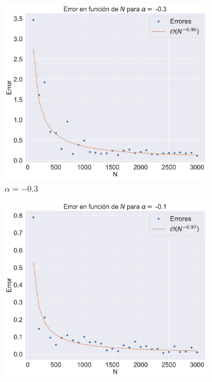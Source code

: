 \begin{figure}[h]
    \centering
    \begin{subfigure}[b]{0.32\textwidth}
        \centering
        \includegraphics[width=\textwidth]{img/content/chapter3/Linear1Errors.pdf}
        \caption{$\alpha=-0.3$}
        \label{fig:image1}
    \end{subfigure}
    \hfill
    \begin{subfigure}[b]{0.32\textwidth}
        \centering
        \includegraphics[width=\textwidth]{img/content/chapter3/Linear2Errors.pdf}

\end{subfigure}
\end{figure}
